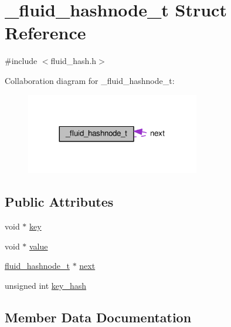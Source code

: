 \hypertarget{struct__fluid__hashnode__t}{}\section{\+\_\+fluid\+\_\+hashnode\+\_\+t Struct Reference}
\label{struct__fluid__hashnode__t}


{\ttfamily \#include $<$fluid\+\_\+hash.\+h$>$}



Collaboration diagram for \+\_\+fluid\+\_\+hashnode\+\_\+t\+:
\nopagebreak
\begin{figure}[H]
\begin{center}
\leavevmode
\includegraphics[width=215pt]{struct__fluid__hashnode__t__coll__graph}
\end{center}
\end{figure}
\subsection*{Public Attributes}
\begin{DoxyCompactItemize}
\item 
void $\ast$ \hyperlink{struct__fluid__hashnode__t_aa0ae0209b77c8eb5d430f621c1b2fd53}{key}
\item 
void $\ast$ \hyperlink{struct__fluid__hashnode__t_a286bda3b48b61da7239c85f1230bec5e}{value}
\item 
\hyperlink{fluid__hash_8h_a050a9781c9fa10e4b1caac67d32b9be4}{fluid\+\_\+hashnode\+\_\+t} $\ast$ \hyperlink{struct__fluid__hashnode__t_a443bdf37dd7b5dce43c328817355796a}{next}
\item 
unsigned int \hyperlink{struct__fluid__hashnode__t_a4933cbefc6aba2c77273cfbdd210376b}{key\+\_\+hash}
\end{DoxyCompactItemize}


\subsection{Member Data Documentation}
\mbox{\label{struct__fluid__hashnode__t_aa0ae0209b77c8eb5d430f621c1b2fd53}} 
